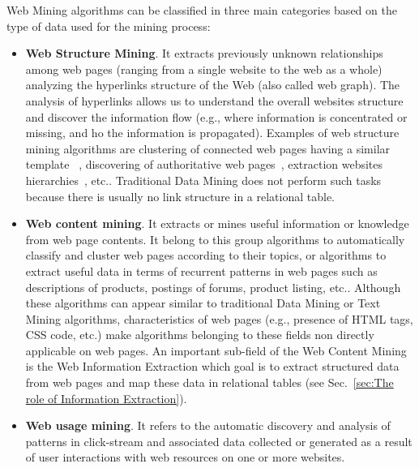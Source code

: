 Web Mining algorithms can be classified in three main categories based on the type of data used for the mining process:
\begin{itemize}
\item \textbf{Web Structure Mining}. It extracts previously unknown relationships among web pages (ranging from a single website to the web as a whole) analyzing the hyperlinks structure of the Web (also called web graph). The analysis of hyperlinks allows us to
understand the overall websites structure and discover the information flow (e.g., where information is concentrated or missing, and ho the information is propagated). %
Examples of web structure mining algorithms are clustering of connected web pages having a similar template ~\cite{Gottron:2008, Blanco:2011}, discovering of authoritative web pages~\cite{Kleinberg:1999, Brin:2012}, extraction websites hierarchies~\cite{Lin:2011, Weninger:2012}, etc.. Traditional Data Mining does not perform such tasks because there is usually no link structure in a relational table.
\item \textbf{Web content mining}. It extracts or mines useful information or knowledge from web page contents. It belong to this group algorithms to automatically classify and cluster web pages according to their topics, %
or algorithms to extract useful data in terms of recurrent patterns 
 in web pages such as descriptions of products, postings of forums, product listing, etc.. Although these algorithms can appear similar to traditional Data Mining or Text Mining algorithms, characteristics of web pages (e.g., presence of HTML tags, CSS code, etc.) make algorithms belonging to these fields non directly applicable on web pages. An important sub-field of the Web Content Mining is the Web Information Extraction which goal is to extract structured data from web pages and map these data in relational tables (see Sec.~\ref{sec:The role of Information Extraction}).
\item \textbf{Web usage mining}. It refers to the automatic discovery and analysis of patterns in click-stream and associated data collected or generated as a result of user interactions with web resources on one or more websites. %

\end{itemize}

